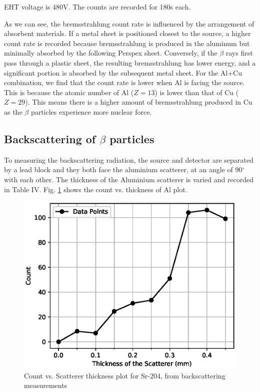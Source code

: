 EHT voltage is 480V. The counts are recorded for 180s each.

As we can see, the bremsstrahlung count rate is influenced by the arrangement of absorbent materials. If a metal sheet is positioned closest to the source, a higher count rate is recorded because bremsstrahlung is produced in the aluminum but minimally absorbed by the following Perspex sheet. Conversely, if the $\beta$ rays first pass through a plastic sheet, the resulting bremsstrahlung has lower energy, and a significant portion is absorbed by the subsequent metal sheet. For the Al+Cu combination, we find that the count rate is lower when Al is facing the source. This is because the atomic number of Al ($Z=13$) is lower than that of Cu ($Z=29$). This means there is a higher amount of bremsstrahlung produced in Cu as the $\beta$ particles experience more nuclear force.

\subsection{Backscattering of $\beta$ particles}

To measuring the backscattering radiation, the source and detector are separated by a lead block and they both face the aluminium scatterer, at an angle of 90$^\circ$ with each other. The thickness of the Aluminium scatterer is varied and recorded in Table IV. Fig. \ref{3} shows the count vs. thickness of Al plot.



\begin{figure}
    \centering
    \includegraphics[width=1\columnwidth]{images/backscat.eps}
    \caption{Count vs. Scatterer thickness plot for Sr-204, from backscattering measurements}
    \label{3}
\end{figure}

